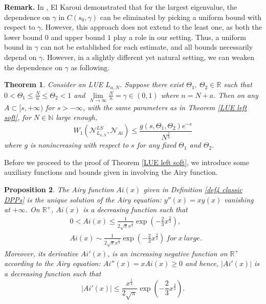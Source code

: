 \documentclass[11pt]{article}
\newtheorem{theorem}{Theorem}[section]
\newtheorem{proposition}[theorem]{Proposition}
\numberwithin{equation}{section}%
\numberwithin{theorem}{section}
\begin{document}
\bigskip\noindent\textbf{Remark.} In \cite{el2006rate}, El Karoui demonstrated that for the largest eigenvalue, the dependence on $\gamma$ in $C(s_0,\gamma)$ can be eliminated by picking a uniform bound with respect to $\gamma$. However, this approach does not extend to the least one, as both the lower bound $0$ and upper bound $1$ play a role in our setting. Thus, a uniform bound in $\gamma$ can not be established for each estimate, and all bounds necessarily depend on $\gamma$. However, in a slightly different yet natural setting, we can weaken the dependence on $\gamma$ as following.
\begin{theorem}\label{LUE soft left2}
    Consider an LUE $L_{a,N}$. Suppose there exist $\Theta_1,~\Theta_2\in \mathbb{R}$ such that $0<\Theta_1\le\frac{N}{n}\le \Theta_2<1$ and $\lim\limits_{N\rightarrow\infty}\frac{N}{n}=\gamma\in(0,1)$ where $n=N+a$. Then on any $A\subset[s,+\infty)$ for $s>-\infty$, with the same parameters as in Theorem \ref{LUE left soft}, for $N\in\mathbb{N}$ large enough,
    \begin{equation}\label{soft2}
W_1\left(\mathcal{N}_{L_{a,N}}^{LS},\mathcal{N}_{Ai}\right)\le\frac{g(s,\Theta_1,\Theta_2)e^{-s}}{N^{\frac{2}{3}}}
    \end{equation}
 where $g$ is nonincreasing with respect to $s$ for any fixed $\Theta_1$ and $\Theta_2$. 
\end{theorem}

Before we proceed to the proof of Theorem \ref{LUE left soft}, we introduce some auxiliary functions and bounds given in \cite[Chapter $11$]{olver1997asymptotics} involving the Airy function.
\begin{proposition}\label{bound for Airy function}\cite[Section $11.1\&11.2$]{olver1997asymptotics} The Airy function $Ai(x)$ given in Definition \ref{def4 classic DPPs} is the unique solution of the {Airy equation}: $y''(x)=xy(x)$ vanishing at $+\infty$. On $\mathbb{R}^+$, $Ai(x)$ is a decreasing function such that
\begin{equation}\label{ExB4Airy}
\begin{split}
        &0<Ai(x)\le\frac{1}{2\sqrt{\pi}x^{\frac{1}{4}}}\exp\left(-\frac{2}{3}x^\frac{3}{2}\right),\\&Ai(x)\sim\frac{1}{2\sqrt{\pi}x^{\frac{1}{4}}}\exp\left(-\frac{2}{3}x^\frac{3}{2}\right)~for~x~large.
\end{split}
\end{equation}
  Moreover, its derivative $Ai'(x)$, is an increasing negative function on $\mathbb{R}^+$ according to the Airy equation: $Ai''(x)=xAi(x)\ge0$ and hence, $|Ai'(x)|$ is a decreasing function such that
  \begin{equation}\label{ExB4Airy'}
      |Ai'(x)|\le \frac{x^\frac{1}{4}}{2\sqrt\pi}\exp\left(-\frac{2}{3}x^\frac{3}{2}\right).
  \end{equation}
\end{proposition}
\end{document}
